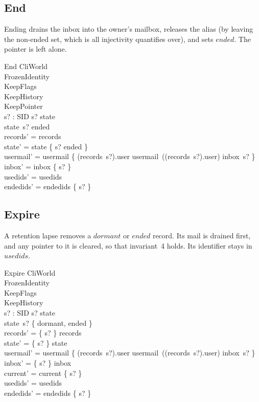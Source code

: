 \documentclass[a4paper,10pt,fleqn]{article}
\begin{document}
\subsection{End}

Ending drains the inbox into the owner's mailbox, releases the alias
(by leaving the non-ended set, which is all injectivity quantifies
over), and sets $ended$.  The pointer is left alone.

\begin{schema}{End}
  \Delta CliWorld \\
  FrozenIdentity \\
  KeepFlags \\
  KeepHistory \\
  KeepPointer \\
  s? : SID
  \where
  s? \in \dom state \\
  state~s? \neq ended \\
  records' = records \\
  state' = state \oplus \{ s? \mapsto ended \} \\
  usermail' = usermail \oplus
    \{ (records~s?).user \mapsto
         usermail~((records~s?).user) \cup inbox~s? \} \\
  inbox' = inbox \oplus \{ s? \mapsto \emptyset \} \\
  usedids' = usedids \\
  endedids' = endedids \cup \{ s? \}
\end{schema}

\subsection{Expire}

A retention lapse removes a $dormant$ or $ended$ record.  Its mail is
drained first, and any pointer to it is cleared, so that invariant~4
holds.  Its identifier stays in $usedids$.

\begin{schema}{Expire}
  \Delta CliWorld \\
  FrozenIdentity \\
  KeepFlags \\
  KeepHistory \\
  s? : SID
  \where
  s? \in \dom state \\
  state~s? \in \{ dormant, ended \} \\
  records' = \{ s? \} \ndres records \\
  state' = \{ s? \} \ndres state \\
  usermail' = usermail \oplus
    \{ (records~s?).user \mapsto
         usermail~((records~s?).user) \cup inbox~s? \} \\
  inbox' = \{ s? \} \ndres inbox \\
  current' = current \nrres \{ s? \} \\
  usedids' = usedids \\
  endedids' = endedids \cup \{ s? \}
\end{schema}
\end{document}
